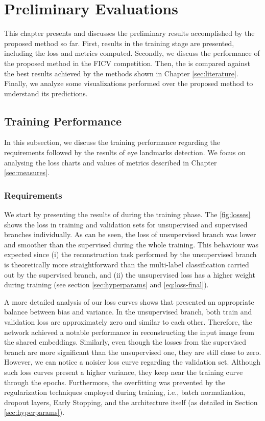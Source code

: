 \section{Preliminary Evaluations} \label{sec:results}

This chapter presents and discusses the preliminary results accomplished by the proposed method so far. First, \methodname results in the training stage are presented, including the loss and metrics computed. Secondly, we discuss the performance of the proposed method in the FICV competition. Then, the \methodname is compared against the best results achieved by the methods shown in Chapter \ref{sec:literature}. Finally, we analyze some visualizations performed over the proposed method to understand its predictions.

\subsection{Training Performance}

In this subsection, we discuss the training performance regarding the \icao requirements followed by the results of eye landmarks detection. We focus on analysing  the loss charts and values of metrics described in Chapter \ref{sec:measures}.

\subsubsection{Requirements}

We start by presenting the results of \methodname during the training phase. The \autoref{fig:losses} shows the loss in training and validation sets for unsupervised and supervised branches individually. As can be seen, the loss of unsupervised branch was lower and smoother than the supervised during the whole training. This behaviour was expected since (i) the reconstruction task performed by the unsupervised branch is theoretically more straightforward than the multi-label classification carried out by the supervised branch, and (ii) the unsupervised loss has a higher weight during training (see section \ref{sec:hyperparams} and \autoref{eq:loss-final}). 

A more detailed analysis of our loss curves shows that \methodname presented an appropriate balance between bias and variance. In the unsupervised branch, both train and validation loss are approximately zero and similar to each other. Therefore, the network achieved a notable performance in reconstructing the input image from the shared embeddings. Similarly, even though the losses from the supervised branch are more significant than the unsupervised one, they are still close to zero. However, we can notice a noisier loss curve regarding the validation set. Although such loss curves present a higher variance, they keep near the training curve through the epochs. Furthermore, the overfitting was prevented by the regularization techniques employed during training, i.e., batch normalization, dropout layers, Early Stopping, and the architecture itself (as detailed in Section \ref{sec:hyperparams}).

